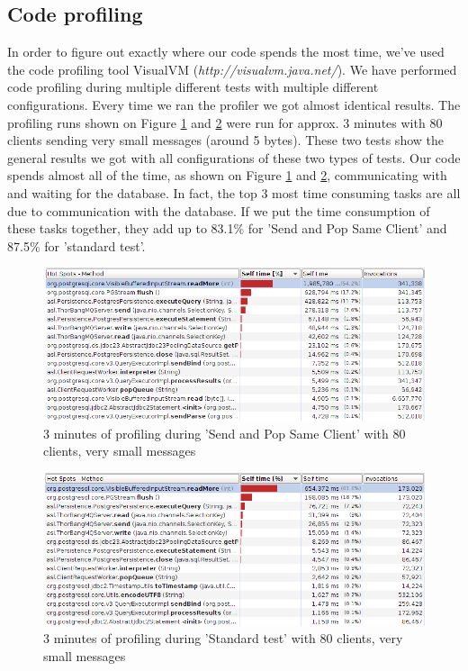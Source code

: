 \documentclass{article}
\begin{document}
        \subsection{Code profiling}
            In order to figure out exactly where our code spends the most time, we've used the code profiling tool VisualVM (\textit{http://visualvm.java.net/}). We have performed code profiling during multiple different tests with multiple different configurations. Every time we ran the profiler we got almost identical results. The profiling runs shown on Figure \ref{fig:code_profiling_send_pop_same_client} and \ref{fig:code_profiling_standard_test} were run for approx. 3 minutes with 80 clients sending very small messages (around 5 bytes). These two tests show the general results we got with all configurations of these two types of tests. Our code spends almost all of the time, as shown on Figure \ref{fig:code_profiling_send_pop_same_client} and \ref{fig:code_profiling_standard_test}, communicating with and waiting for the database. In fact, the top 3 most time consuming tasks are all due to communication with the database. If we put the time consumption of these tasks together, they add up to 83.1\% for 'Send and Pop Same Client' and 87.5\% for 'standard test'.
            \begin{figure}[H]
                \hspace{-1.5cm}
                \includegraphics[scale=0.50]{code_profiling_send_pop_same_client}
                \caption{3 minutes of profiling during 'Send and Pop Same Client' with 80 clients, very small messages}
                \label{fig:code_profiling_send_pop_same_client}
            \end{figure}
            \begin{figure}[H]
                \hspace{-1.5cm}
                \includegraphics[scale=0.50]{code_profiling_standard_test}
                \caption{3 minutes of profiling during 'Standard test' with 80 clients, very small messages}
                \label{fig:code_profiling_standard_test}
            \end{figure}
\end{document}
